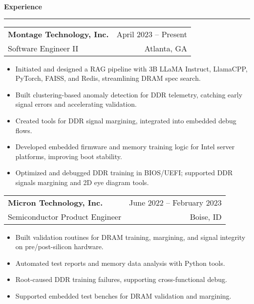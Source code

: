 \documentclass[a4paper,10pt]{article}
\begin{document}
\vspace{0.1in}
\textbf{Experience}
\vspace{0.05in}
\hrule
\vspace{0.1in}

\noindent
\begin{minipage}[t]{0.99\textwidth}
  \begin{tabularx}{\textwidth}{@{} X r @{}}
  \textbf{Montage Technology, Inc.} & April 2023 -- Present \\
  Software Engineer II & Atlanta, GA \\
  \end{tabularx}
\end{minipage}


\vspace{4pt}
\begin{itemize}[leftmargin=*, itemsep=0pt, topsep=0pt, parsep=0pt, partopsep=0pt]
  \item Initiated and designed a RAG pipeline with 3B LLaMA Instruct, LlamaCPP, PyTorch, FAISS, and Redis, streamlining DRAM spec search.
  \item Built clustering-based anomaly detection for DDR telemetry, catching early signal errors and accelerating validation.
  \item Created tools for DDR signal margining, integrated into embedded debug flows.
  \item Developed embedded firmware and memory training logic for Intel server platforms, improving boot stability.
  \item Optimized and debugged DDR training in BIOS/UEFI; supported DDR signals margining and 2D eye diagram tools.
\end{itemize}

\vspace{0.1in}

\noindent
\begin{minipage}[t]{0.99\textwidth}
  \begin{tabularx}{\textwidth}{@{} X r @{}}
  \textbf{Micron Technology, Inc.} & June 2022 -- February 2023 \\
Semiconductor Product Engineer & Boise, ID \\
  \end{tabularx}
\end{minipage}
\vspace{4pt}
\begin{itemize}[leftmargin=*, itemsep=0pt, topsep=0pt, parsep=0pt, partopsep=0pt]
  \item Built validation routines for DRAM training, margining, and signal integrity on pre/post-silicon hardware.
  \item Automated test reports and memory data analysis with Python tools.
  \item Root-caused DDR training failures, supporting cross-functional debug.
  \item Supported embedded test benches for DRAM validation and margining.
\end{itemize}
\end{document}
